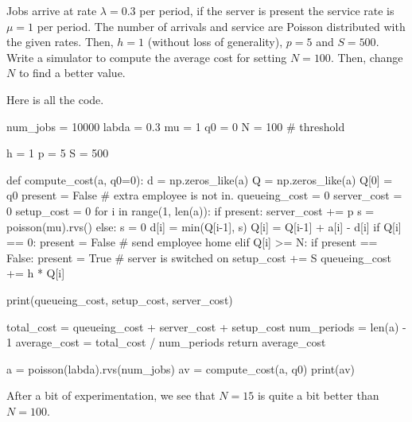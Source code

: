 \documentclass{scrartcl}
\begin{document}
\begin{exercise}
  Jobs arrive at rate $\lambda=0.3$ per period, if the server is present the service rate is $\mu=1$ per period. The number of arrivals and service are Poisson distributed with the given rates. Then, $h=1$ (without loss of generality), $p=5$ and $S=500$. Write a simulator to compute the average cost for setting $N=100$. Then, change $N$ to find a better value.

\begin{solution}
Here is all the code.  
\begin{pyverbatim}
num_jobs = 10000
labda = 0.3
mu = 1
q0 = 0
N = 100 # threshold

h = 1
p = 5
S = 500


def compute_cost(a, q0=0):
    d = np.zeros_like(a)
    Q = np.zeros_like(a)
    Q[0] = q0
    present = False  # extra employee is not in.
    queueing_cost = 0
    server_cost = 0
    setup_cost = 0
    for i in range(1, len(a)):
        if present:
            server_cost += p
            s = poisson(mu).rvs()
        else:
            s = 0
        d[i] = min(Q[i-1], s)
        Q[i] = Q[i-1] + a[i] - d[i]
        if Q[i] == 0:
            present = False  # send employee home
        elif Q[i] >= N:
            if present == False: 
	            present = True # server is switched on
                setup_cost += S            
        queueing_cost += h * Q[i]

    print(queueing_cost, setup_cost, server_cost)

    total_cost = queueing_cost + server_cost + setup_cost
    num_periods = len(a) - 1
    average_cost = total_cost / num_periods
    return average_cost

a = poisson(labda).rvs(num_jobs)
av = compute_cost(a, q0)
print(av)
\end{pyverbatim}
After a bit of experimentation, we see that $N=15$ is quite a bit better than $N=100$.

\end{solution}


\end{exercise}
\end{document}
